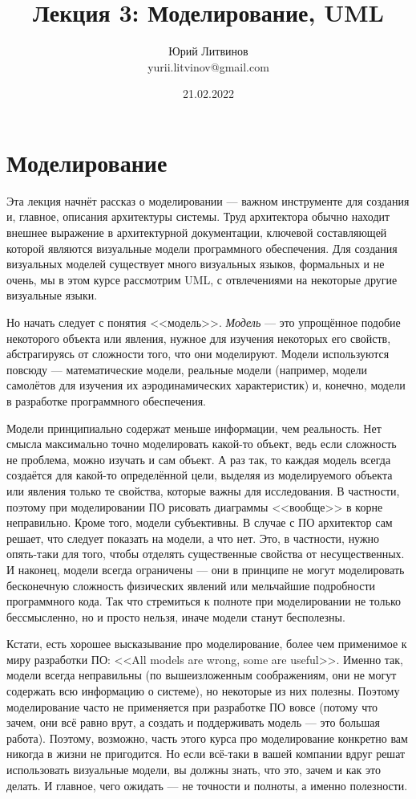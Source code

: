 \documentclass[a5paper]{article}
\title{Лекция 3: Моделирование, UML}
\author{Юрий Литвинов\\\small{yurii.litvinov@gmail.com}}
\date{21.02.2022}
\begin{document}
\maketitle
\thispagestyle{empty}

\section{Моделирование}

Эта лекция начнёт рассказ о моделировании --- важном инструменте для создания и, главное, описания архитектуры системы. Труд архитектора обычно находит внешнее выражение в архитектурной документации, ключевой составляющей которой являются визуальные модели программного обеспечения. Для создания визуальных моделей существует много визуальных языков, формальных и не очень, мы в этом курсе рассмотрим UML, с отвлечениями на некоторые другие визуальные языки.

Но начать следует с понятия <<модель>>. \textit{Модель} --- это упрощённое подобие некоторого объекта или явления, нужное для изучения некоторых его свойств, абстрагируясь от сложности того, что они моделируют. Модели используются повсюду --- математические модели, реальные модели (например, модели самолётов для изучения их аэродинамических характеристик) и, конечно, модели в разработке программного обеспечения.

Модели принципиально содержат меньше информации, чем реальность. Нет смысла максимально точно моделировать какой-то объект, ведь если сложность не проблема, можно изучать и сам объект. А раз так, то каждая модель всегда создаётся для какой-то определённой цели, выделяя из моделируемого объекта или явления только те свойства, которые важны для исследования. В частности, поэтому при моделировании ПО рисовать диаграммы <<вообще>> в корне неправильно. Кроме того, модели субъективны. В случае с ПО архитектор сам решает, что следует показать на модели, а что нет. Это, в частности, нужно опять-таки для того, чтобы отделять существенные свойства от несущественных. И наконец, модели всегда ограничены --- они в принципе не могут моделировать бесконечную сложность физических явлений или мельчайшие подробности программного кода. Так что стремиться к полноте при моделировании не только бессмысленно, но и просто нельзя, иначе модели станут бесполезны.

Кстати, есть хорошее высказывание про моделирование, более чем применимое к миру разработки ПО: <<All models are wrong, some are useful>>. Именно так, модели всегда неправильны (по вышеизложенным соображениям, они не могут содержать всю информацию о системе), но некоторые из них полезны. Поэтому моделирование часто не применяется при разработке ПО вовсе (потому что зачем, они всё равно врут, а создать и поддерживать модель --- это большая работа). Поэтому, возможно, часть этого курса про моделирование конкретно вам никогда в жизни не пригодится. Но если всё-таки в вашей компании вдруг решат использовать визуальные модели, вы должны знать, что это, зачем и как это делать. И главное, чего ожидать --- не точности и полноты, а именно полезности.
\end{document}
